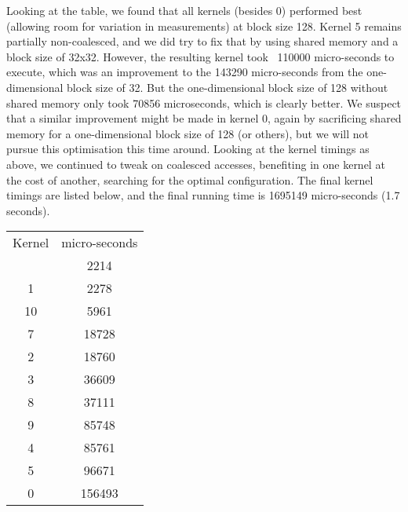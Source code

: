 Looking at the table, we found that all kernels (besides 0) performed best (allowing room for variation in measurements) at block size 128.\n
Kernel 5 remains partially non-coalesced, and we did try to fix that by using shared memory and a block size of 32x32. However, the resulting kernel took ~110000 micro-seconds to execute, which was an improvement to the 143290 micro-seconds from the one-dimensional block size of 32. But the one-dimensional block size of 128 without shared memory only took 70856 microseconds, which is clearly better.\n
We suspect that a similar improvement might be made in kernel 0, again by sacrificing shared memory for a one-dimensional block size of 128 (or others), but we will not pursue this optimisation this time around.\n
Looking at the kernel timings as above, we continued to tweak on coalesced accesses, benefiting in one kernel at the cost of another, searching for the optimal configuration.\n
The final kernel timings are listed below, and the final running time is 1695149 micro-seconds (1.7 seconds).


\begin{tabular}{c | c}
Kernel & micro-seconds \\
\vline
6  & 2214 \\
1  & 2278 \\
10 & 5961 \\
7  & 18728 \\
2  & 18760 \\
3  & 36609 \\
8  & 37111 \\
9  & 85748 \\
4  & 85761 \\
5  & 96671 \\
0  & 156493
\end{tabular}



